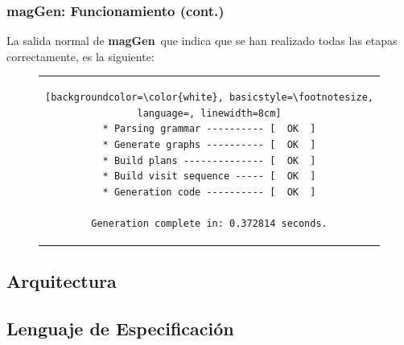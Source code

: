 \documentclass[10pt, xcolor=table, xcolor=dvipsnames]{beamer}
\newcommand{\maggen}{\textbf{magGen}}
\begin{document}
\begin{frame}[fragile]
    \frametitle{\maggen: Funcionamiento (cont.)}

    La salida normal de \maggen\ que indica que se han realizado todas las etapas correctamente, es la siguiente:

\begin{figure}[h]
\begin{center}
\begin{tabular}{c}
\begin{lstlisting}[backgroundcolor=\color{white}, basicstyle=\footnotesize, language=, linewidth=8cm]
* Parsing grammar ---------- [  OK  ]
* Generate graphs ---------- [  OK  ]
* Build plans -------------- [  OK  ]
* Build visit sequence ----- [  OK  ]
* Generation code ---------- [  OK  ]

Generation complete in: 0.372814 seconds.
\end{lstlisting}
\end{tabular}
\end{center}
\end{figure}
\end{frame}

\subsection*{Arquitectura}


\subsection{Lenguaje de Especificación}
\end{document}

